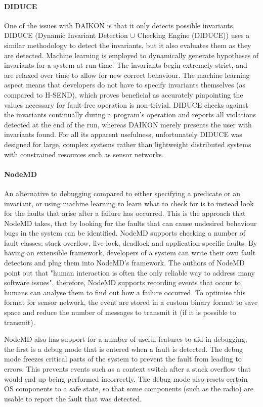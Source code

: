 \paragraph{DIDUCE} One of the issues with DAIKON is that it only detects possible invariants, DIDUCE \cite{diduce} (Dynamic Invariant Detection $\cup$ Checking Engine (DIDUCE)) uses a similar methodology to detect the invariants, but it also evaluates them as they are detected. Machine learning is employed to dynamically generate hypotheses of invariants for a system at run-time. The invariants begin extremely strict, and are relaxed over time to allow for new correct behaviour. The machine learning aspect means that developers do not have to specify invariants themselves (as compared to H-SEND), which proves beneficial as accurately pinpointing the values necessary for fault-free operation is non-trivial\cite{?}. DIDUCE checks against the invariants continually during a program's operation and reports all violations detected at the end of the run, whereas DAIKON merely presents the user with invariants found. For all its apparent usefulness, unfortunately DIDUCE was designed for large, complex systems rather than lightweight distributed systems with constrained resources such as sensor networks.

\paragraph{NodeMD} An alternative to debugging compared to either specifying a predicate or an invariant, or using machine learning to learn what to check for is to instead look for the faults that arise after a failure has occurred. This is the approach that NodeMD \cite{NodeMD} takes, that by looking for the faults that can cause undesired behaviour bugs in the system can be identified. NodeMD supports checking a number of fault classes: stack overflow, live-lock, deadlock and application-specific faults. By having an extensible framework, developers of a system can write their own fault detectors and plug them into NodeMD's framework. The authors of NodeMD point out that "human interaction is often the only reliable way to address many software issues", therefore, NodeMD supports recording events that occur to humans can analyse them to find out how a failure occurred. To optimise this format for sensor network, the event are stored in a custom binary format to save space and reduce the number of messages to transmit it (if it is possible to transmit).

NodeMD also has support for a number of useful features to aid in debugging, the first is a debug mode that is entered when a fault is detected. The debug mode freezes critical parts of the system to prevent the fault from leading to errors. This prevents events such as a context switch after a stack overflow that would end up being performed incorrectly. The debug mode also resets certain OS components to a safe state, so that some components (such as the radio) are usable to report the fault that was detected.

